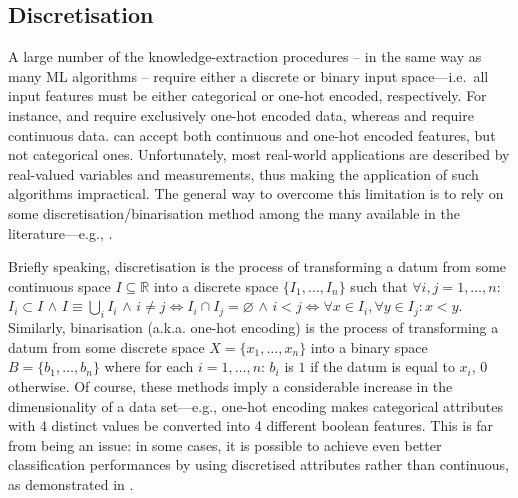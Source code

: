 \documentclass[12pt,a4paper,openright,twoside]{book}
\begin{document}
\subsection{Discretisation}

A large number of the knowledge-extraction procedures -- in the same way as many ML algorithms -- require either a discrete or binary input space---i.e.\ all input features must be either categorical or one-hot encoded, respectively.
%
For instance, \real{} and \trepan{} require exclusively one-hot encoded data, whereas \iter{} and \gridex{} require continuous data.
%
\cart{} can accept both continuous and one-hot encoded features, but not categorical ones.
%
Unfortunately, most real-world applications are described by real-valued variables and measurements, thus making the application of such algorithms impractical.
%
The general way to overcome this limitation is to rely on some discretisation/binarisation method among the many available in the literature---e.g., \cite{DoughertyKS95,YangWW10,Kerber92,HoS97,Boulle04,KurganC04,Cano2016}.

Briefly speaking, discretisation is the process of transforming a datum from some continuous space $I \subseteq \mathbb{R}$ into a discrete space $\{ I_1, \ldots, I_n \}$ such that $\forall i,j  = 1, \ldots, n$:
%
$I_i \subset I$
$\wedge$ %
$I \equiv \bigcup_i I_i$
$\wedge$ %
$i \neq j \Leftrightarrow I_i \cap I_j = \varnothing $
$\wedge$ %
$i < j \Leftrightarrow \forall x \in I_i, \forall y \in I_j : x < y $.
%
Similarly, binarisation (a.k.a. one-hot encoding) is the process of transforming a datum from some discrete space $X = \{x_1, \ldots, x_n \}$ into a binary space $B = \{ b_1, \ldots, b_{n} \}$ where for each $i  = 1, \ldots, n$: $b_i$ is $1$ if the datum is equal to $x_i$, $0$ otherwise.
%
Of course, these methods imply a considerable increase in the dimensionality of a data set---e.g., one-hot encoding makes categorical attributes with 4 distinct values be converted into 4 different boolean features.
%
This is far from being an issue: in some cases, it is possible to achieve even better classification performances by using discretised attributes rather than continuous, as demonstrated in \cite{ElhilbawiE021}.
\end{document}
